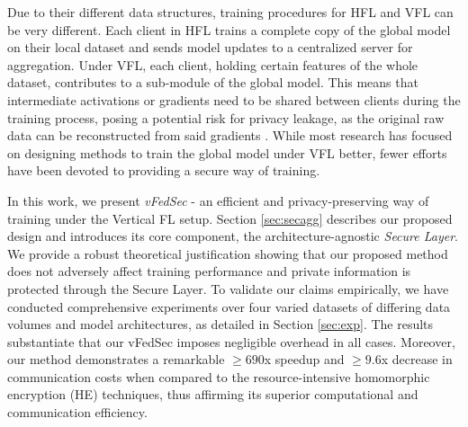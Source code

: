 \documentclass[withindex,glossary]{cam-thesis}
\begin{document}
Due to their different data structures, training procedures for HFL and VFL can be very different. Each client in HFL trains a complete copy of the global model on their local dataset and sends model updates to a centralized server for aggregation. Under VFL,  each client, holding certain features of the whole dataset, contributes to a sub-module of the global model. This means that intermediate activations or gradients need to be shared between clients during the training process, posing a potential risk for privacy leakage, as the original raw data can be reconstructed from said gradients \citep{dlg, idlg, jin2021cafe,yin2021see}. While most research has focused on designing methods to train the global model under VFL better, fewer efforts have been devoted to providing a secure way of training. %



In this work, we present \emph{vFedSec} - an efficient and privacy-preserving way of training under the Vertical FL setup. %
Section \ref{sec:secagg} describes our proposed design and introduces its core component, the architecture-agnostic \emph{Secure Layer}.
We provide a robust theoretical justification showing that our proposed method does not adversely affect training performance and private information is protected through the Secure Layer. To validate our claims empirically, we have conducted comprehensive experiments over four varied datasets of differing data volumes and model architectures, as detailed in Section \ref{sec:exp}. The results substantiate that our vFedSec imposes negligible overhead in all cases. Moreover, our method demonstrates a remarkable $\geq 690$x speedup and $\geq 9.6$x decrease in communication costs when compared to the resource-intensive homomorphic encryption (HE) techniques, thus affirming its superior computational and communication efficiency. %
\end{document}
